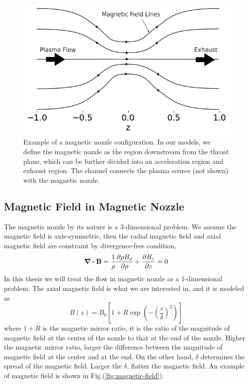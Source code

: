 \begin{figure}[htbp]
	\centering
	\includegraphics[width=0.7\linewidth]{img/magnetic-nozzle}
	\caption{Example of a magnetic nozzle configuration. In our models, we define the magnetic nozzle as the region downstream from the throat plane, which can be further divided into an acceleration region and exhaust region. The channel connects the plasma source (not shown) with the magnetic nozzle. \cite{little_performance_2015}}
	\label{fig:magnetic-nozzle}
\end{figure}

\subsection{Magnetic Field in Magnetic Nozzle} \label{sec:magnetic-field-in-nozzle}
The magnetic nozzle by its nature is a 3-dimensional problem. We assume the magnetic field is axis-symmetric, then the radial magnetic field and axial magnetic field are constraint by divergence-free condition,
\[ \div\mathbf{B} = \frac{1}{\rho}\pdv{\rho B_\rho}{\rho} + \pdv{B_z}{z} = 0 \]
In this thesis we will treat the flow in magnetic nozzle as a 1-dimensional problem. The axial magnetic field is what we are interested in, and it is modeled as
\[ B(z) = B_0 \left[1 + R\exp(-\left(\frac{z}{\delta}\right)^2)\right] \]
where $1+R$ is the magnetic mirror ratio, it is the ratio of the magnitude of magnetic field at the center of the nozzle to that at the end of the nozzle. Higher the magnetic mirror ratio, larger the difference between the magnitude of magnetic field at the center and at the end. On the other hand, $\delta$ determines the spread of the magnetic field. Larger the $\delta$, flatter the magnetic field. An example of magnetic field is shown in Fig.(\ref{fig:magnetic-field}).

